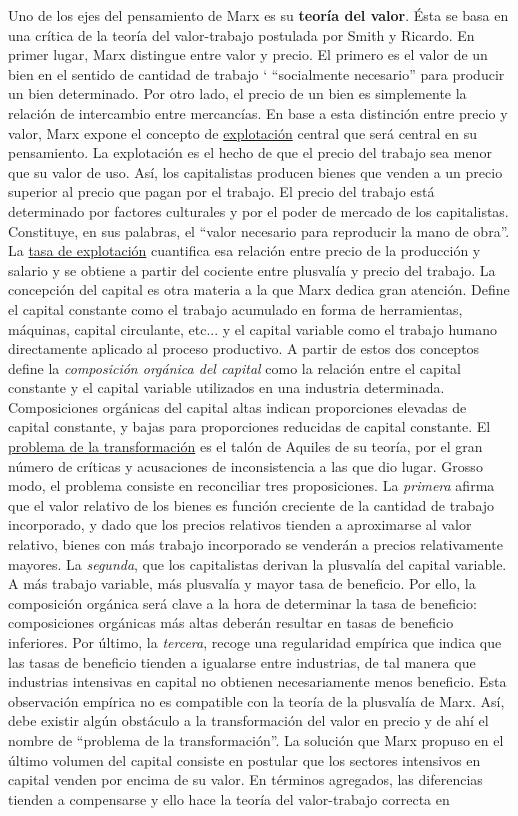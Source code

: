 \documentclass{nuevotema}
\begin{document}
Uno de los ejes del pensamiento de Marx es su \textbf{teoría del valor}. Ésta se basa en una crítica de la teoría del valor-trabajo postulada por Smith y Ricardo. En primer lugar, Marx distingue entre valor y precio. El primero es el valor de un bien en el sentido de cantidad de trabajo ` ``socialmente necesario'' para producir un bien determinado. Por otro lado, el precio de un bien es simplemente la relación de intercambio entre mercancías. En base a esta distinción entre precio y valor, Marx expone el concepto de \underline{explotación} central que será central en su pensamiento. La explotación es el hecho de que el precio del trabajo sea menor que su valor de uso. Así, los capitalistas producen bienes que venden a un precio superior al precio que pagan por el trabajo. El precio del trabajo está determinado por factores culturales y por el poder de mercado de los capitalistas. Constituye, en sus palabras, el ``valor necesario para reproducir la mano de obra''. La \underline{tasa de explotación} cuantifica esa relación entre precio de la producción y salario y se obtiene a partir del cociente entre plusvalía y precio del trabajo. La concepción del capital es otra materia a la que Marx dedica gran atención. Define el capital constante como el trabajo acumulado en forma de herramientas, máquinas, capital circulante, etc... y el capital variable como el trabajo humano directamente aplicado al proceso productivo. A partir de estos dos conceptos define la \textit{composición orgánica del capital} como la relación entre el capital constante y el capital variable utilizados en una industria determinada. Composiciones orgánicas del capital altas indican proporciones elevadas de capital constante, y bajas para proporciones reducidas de capital constante. El \underline{problema de la transformación} es el talón de Aquiles de su teoría, por el gran número de críticas y acusaciones de inconsistencia a las que dio lugar. Grosso modo, el problema consiste en reconciliar tres proposiciones. La \textit{primera} afirma que el valor relativo de los bienes es función creciente de la cantidad de trabajo incorporado, y dado que los precios relativos tienden a aproximarse al valor relativo, bienes con más trabajo incorporado se venderán a precios relativamente mayores. La \textit{segunda}, que los capitalistas derivan la plusvalía del capital variable. A más trabajo variable, más plusvalía y mayor tasa de beneficio. Por ello, la composición orgánica será clave a la hora de determinar la tasa de beneficio: composiciones orgánicas más altas deberán resultar en tasas de beneficio inferiores. Por último, la \textit{tercera}, recoge una regularidad empírica que indica que las tasas de beneficio tienden a igualarse entre industrias, de tal manera que industrias intensivas en capital no obtienen necesariamente menos beneficio. Esta observación empírica no es compatible con la teoría de la plusvalía de Marx. Así, debe existir algún obstáculo a la transformación del valor en precio y de ahí el nombre de ``problema de la transformación''. La solución que Marx propuso en el último volumen del capital consiste en postular que los sectores intensivos en capital venden por encima de su valor. En términos agregados, las diferencias tienden a compensarse y ello hace la teoría del valor-trabajo correcta en 
\end{document}
